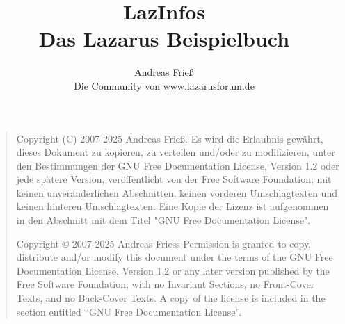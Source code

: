 \documentclass[
titlepage,						%
]
{scrreprt}
\begin{document}
\setcounter{tocdepth}{3} %

\pagestyle{empty} %
\title{LazInfos\\Das Lazarus Beispielbuch}
\author{Andreas Frieß\\Die Community von www.lazarusforum.de}

\maketitle 						%

\pagestyle{headings} %

\begin{quote}
    Copyright (C) 2007-2025 Andreas Frieß.
    Es wird die Erlaubnis gewährt, dieses Dokument zu kopieren, zu
    verteilen und/oder zu modifizieren, unter den Bestimmungen der
    GNU Free Documentation License, Version 1.2 oder jede spätere
    Version, veröffentlicht von der Free Software Foundation; mit
    keinen unveränderlichen Abschnitten, keinen vorderen
    Umschlagtexten und keinen hinteren Umschlagtexten. Eine Kopie der
    Lizenz ist aufgenommen in den Abschnitt mit dem Titel "GNU Free
    Documentation License".

    Copyright \copyright{}  2007-2025 Andreas Friess
    Permission is granted to copy, distribute and/or modify this document
    under the terms of the GNU Free Documentation License, Version 1.2
    or any later version published by the Free Software Foundation;
    with no Invariant Sections, no Front-Cover Texts, and no Back-Cover Texts.
    A copy of the license is included in the section entitled ``GNU
    Free Documentation License''.
\end{quote}

\tableofcontents			%
\end{document}
